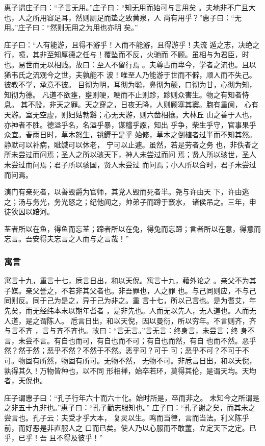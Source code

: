\documentclass[]{article}
\begin{document}
惠子谓庄子曰：``子言无用。''庄子曰：``知无用而始可与言用矣
。夫地非不广且大也，人之所用容足耳，然则厕足而垫之致黄泉，人
尚有用乎？''惠子曰：``无用。''庄子曰：``然则无用之为用也亦明 矣。''

庄子曰：``人有能游，且得不游乎！人而不能游，且得游乎！夫流
遁之志，决绝之行，噫，其非至知厚德之任与！覆坠而不反，火驰而
不顾。虽相与为君臣，时也。易世而无以相贱。故曰：至人不留行焉
。夫尊古而卑今，学者之流也。且以狶韦氏之流观今之世，夫孰能不
波！唯至人乃能游于世而不僻，顺人而不失己。彼教不学，承意不彼。
目彻为明，耳彻为聪，鼻彻为颤，口彻为甘，心彻为知，知彻为德。
凡道不欲壅，壅则哽，哽而不止则跈，跈则众害生。物之有知者恃息。
其不殷，非天之罪。天之穿之，日夜无降，人则顾塞其窦。胞有重阆，
心有天游。室无空虚，则妇姑勃谿；心无天游，则六凿相攘。大林丘
山之善于人也，亦神者不胜。德溢乎名，名溢乎暴，谋稽乎誸，知出
乎争，柴生乎守，官事果乎众宜。春雨日时，草木怒生，铫鎒于是乎
始修，草木之倒植者过半而不知其然。静默可以补病，眦媙可以休老，
宁可以止遽。虽然，若是劳者之务
也，非佚者之所未尝过而问焉；圣人之所以骇天下，神人未尝过而问
焉；贤人所以骇世，圣人未尝过而问焉；君子所以骇国，贤人未尝过
而问焉；小人所以合时，君子未尝过而问焉。

演门有亲死者，以善毁爵为官师，其党人毁而死者半。尧与许由天
下，许由逃之；汤与务光，务光怒之；纪他闻之，帅弟子而蹲于窾水，
诸侯吊之。三年，申徒狄因以踣河。

荃者所以在鱼，得鱼而忘荃；蹄者所以在兔，得兔而忘蹄；言者所以在意，得意而忘言。吾安得夫忘言之人而与之言哉！''

\hypertarget{header-n2348}{%
\subsubsection{寓言}\label{header-n2348}}

寓言十九，重言十七，卮言日出，和以天倪。寓言十九，藉外论之
。亲父不为其子媒。亲父誉之，不若非其父者也。非吾罪也，人之罪
也。与己同则应，不与己同则反。同于己为是之，异于己为非之。重
言十七，所以己言也。是为耆艾，年先矣，而无经纬本末以期年耆者
，是非先也。人而无以先人，无人道也。人而无人道，是之谓陈人。
卮言日出，和以天倪，因以曼衍，所以穷年。不言则齐，齐与言不齐
，言与齐不齐也。故曰：``言无言。''言无言：终身言，未尝言；终
身不言，未尝不言。有自也而可，有自也而不可；有自也而然，有自
也而不然。恶乎然？然于然；恶乎不然？不然于不然。恶乎可？可于
可；恶乎不可？不可于不可。物固有所然，物固有所可。无物不然，
无物不可。非卮言日出，和以天倪，孰得其久！万物皆种也，以不同
形相禅，始卒若环，莫得其伦，是谓天均。天均者，天倪也。

庄子谓惠子曰：``孔子行年六十而六十化。始时所是，卒而非之。
未知今之所谓是之非五十九非也。''惠子曰：``孔子勤志服知也。''
庄子曰：``孔子谢之矣，而其未之尝言也。孔子云：夫受才乎大本，
复灵以生。鸣而当律，言而当法。利义陈乎前，而好恶是非直服人之
口而已矣。使人乃以心服而不敢蘁，立定天下之定。已乎，已乎！吾
且不得及彼乎！''
\end{document}
